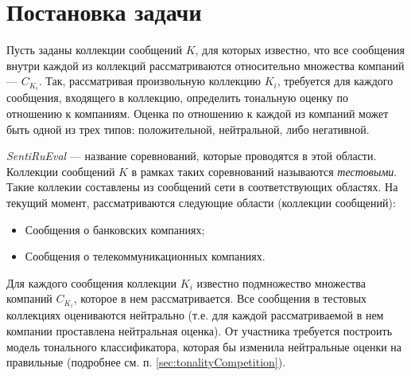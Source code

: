 \newpage
\section{Постановка задачи}
    Пусть заданы коллекции сообщений $K$, для которых известно, что все сообщения
    внутри каждой из коллекций рассматриваются относительно множества компаний ---
    $C_{K_{i}}$.
    Так, рассматривая произвольную коллекцию $K_i$, требуется для каждого
    сообщения, входящего в коллекцию, определить тональную оценку по отношению к
    компаниям.
    Оценка по отношению к каждой из компаний может быть одной из
    трех типов: положительной, нейтральной, либо негативной.

    {\it SentiRuEval} --- название соревнований, которые проводятся в этой
    области. Коллекции сообщений $K$ в рамках таких соревнований называются
    {\it тестовыми}.
    Такие коллекии составлены из сообщений сети \twitter в соответствующих областях.
    На текущий момент, рассматриваются следующие области (коллекции сообщений):
    \begin{itemize}
        \item Сообщения о банковских компаниях;
        \item Сообщения о телекоммуникационных компаниях.
    \end{itemize}

    Для каждого сообщения коллекции $K_i$ известно подмножество
    множества компаний $C_{K_{i}}$, которое в нем рассматривается. Все сообщения в
    тестовых коллекциях оцениваются нейтрально (т.е. для каждой рассматриваемой
    в нем компании проставлена нейтральная оценка).
    От участника требуется построить модель тонального классификатора,
    которая бы изменила нейтральные оценки на правильные
    (подробнее см. п. \ref{sec:tonalityCompetition}).
